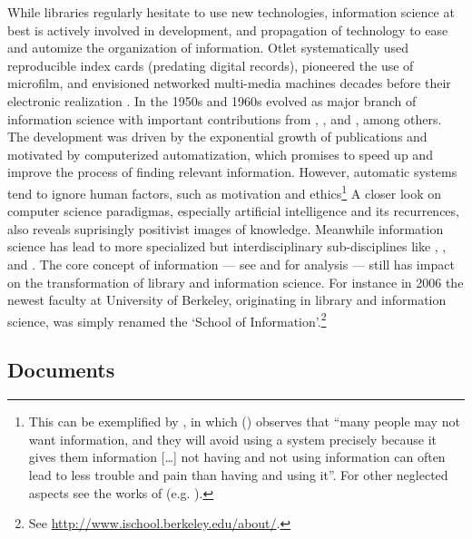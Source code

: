 While libraries regularly hesitate to use new technologies, information science
at best is actively involved in development, and propagation of technology to
ease and automize the organization of information. Otlet systematically used
reproducible index cards (predating digital records), pioneered the use of
microfilm, and envisioned networked multi-media machines decades before their
electronic realization \cite{Otlet1990,Otlet1934}. In the 1950s and 1960s
 evolved as major branch of information science
with important contributions from ,
, and , among others.  The
development was driven by the exponential growth of publications
\cite{Price1963} and motivated by computerized automatization, which promises
to speed up and improve the process of finding relevant information.  However,
automatic systems tend to ignore human factors, such as motivation and
ethics\footnote{This can be exemplified by , in which
	 (\citeyear{Mooers1960}) observes that ``many people
	may not want information, and they will avoid using a system precisely
	because it gives them information [\ldots] not having and not using
	information can often lead to less trouble and pain than having and using
	it''.  For other neglected aspects see the works of
 (e.g.  \citeyear{Weizenbaum1976}).} A closer look
on computer science paradigmas, especially artificial intelligence and its
recurrences, also reveals suprisingly positivist images of knowledge.
Meanwhile information science has lead to more specialized but
interdisciplinary sub-disciplines like ,
, and . The core
concept of information --- see \textcite{Capurro2003} and \textcite{Ma2012} for
analysis --- still has impact on the transformation of library and information
science. For instance in 2006 the newest faculty at University of Berkeley,
originating in library and information science, was simply renamed the `School
of Information'.\footnote{See \url{http://www.ischool.berkeley.edu/about/}.}

\subsection{Documents}
\label{sub:documents}

